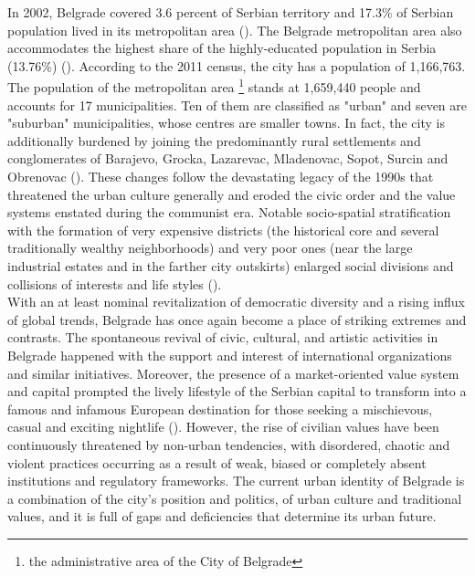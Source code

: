 \documentclass[11pt]{report}
\begin{document}
{{{{%
In 2002, Belgrade covered 3.6 percent of Serbian territory and 17.3\% of Serbian population lived in its metropolitan area (\href{Cities}{\citealt{world_bank_cities_2000}}).
The Belgrade metropolitan area also accommodates the highest share of the highly-educated population in Serbia (13.76\%) (\href{Vukmirovic}{\citealt{vukmirovic_city_2013}}).
According to the 2011 census, the city has a population of 1,166,763.
The population of the metropolitan area
\footnote{the administrative area of the City of Belgrade}                 
stands at 1,659,440 people and accounts for 17 municipalities.
Ten  of them are classified as "urban" and seven are "suburban" municipalities, whose centres are smaller towns.
In fact, the  city  is additionally burdened by joining the predominantly rural  settlements  and  conglomerates  of Barajevo, Grocka,  Lazarevac,  Mladenovac,  Sopot,  Surcin  and Obrenovac (\href{Doytchinov}{\citealt{doytchinov_belgrade_2015}}).
These changes follow  the  devastating legacy of the 1990s that threatened the urban culture generally and eroded the civic order and the value systems enstated during the communist era. Notable socio-spatial stratification with the formation of very expensive districts (the historical core and several traditionally wealthy neighborhoods) and very poor ones (near the large industrial estates and in the farther city outskirts) enlarged social  divisions  and  collisions  of  interests  and  life styles (\href{Hirt}{\citealt{hirt_belgrade_2009}}).
\\

With  an  at  least  nominal  revitalization  of  democratic  diversity  and  a  rising  influx  of global  trends,  Belgrade  has once  again  become  a  place  of  striking  extremes  and  contrasts. The spontaneous  revival  of  civic,  cultural,  and artistic  activities  in  Belgrade  happened  with  the support and interest of international organizations and similar initiatives. Moreover,  the  presence  of  a market-oriented  value  system  and  capital  prompted  the  lively lifestyle of the Serbian capital to transform into a famous and infamous European destination for those seeking a mischievous, casual and exciting nightlife (\href{Doytchinov}{\citealt{doytchinov_urban_2015}}).
However, the rise of civilian values have been continuously  threatened by  non-urban  tendencies,  with disordered,  chaotic and violent practices occurring as a result  of  weak,  biased  or  completely absent institutions and regulatory frameworks. The current urban identity of Belgrade is a combination of the city’s position and politics, of urban culture and traditional values, and it is full of gaps and deficiencies that determine its urban future.
\\

}}}}
\end{document}
